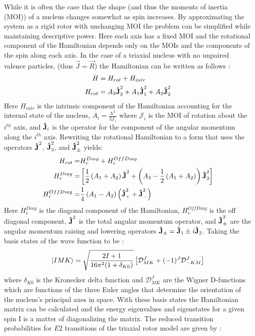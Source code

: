 While it is often the case that the shape (and thus the moments of inertia (MOI)) of a nucleus changes somewhat as spin increases. By approximating the system as a rigid rotor with unchanging MOI the problem can be simplified while maintaining descriptive power. Here each axis has a fixed MOI and the rotational component of the Hamiltonian depends only on the MOIs and the components of the spin along each axis. In the case of a triaxial nucleus with no unpaired valence particles, (thus $\vec{J}=\vec{R}$) the Hamiltonian can be written as follows \cite{triaxRotorSol,wobblingGeometry}:
\begin{align}
\label{eqn:chp2-triaxial-rotor-hamiltonian}
H &= H_{rot} + H_{intr} \\
H_{rot}&=A_3\boldsymbol{\hat{\textbf{J}}}_3^2 + A_1\boldsymbol{\hat{\textbf{J}}}_1^2 + A_2\boldsymbol{\hat{\textbf{J}}}_2^2
\end{align}
Here $H_{intr}$ is the intrinsic component of the Hamiltonian accounting for the internal state of the nucleus, $A_i = \frac{\hbar^2}{2 \mathcal{J}_i}$ where $\mathcal{J}_i$ is the MOI of rotation about the $i^{th}$ axis, and $\boldsymbol{\hat{\textbf{J}}}_i$ is the operator for the component of the angular momentum along the $i^{th}$ axis. Rewriting the rotational Hamiltonian to a form that uses the operators $\boldsymbol{\hat{\textbf{J}}}^2$, $\boldsymbol{\hat{\textbf{J}}}^2_3$, and $\boldsymbol{\hat{\textbf{J}}}^2_{\pm}$ yields:
\begin{align}
\label{eqn:chp2-triaxial-rotor-hamiltonian-rewrite}
H_{rot}=& H_{r}^{Diag} + H_{r}^{OffDiag}\\
H_{r}^{Diag}=&\left[\frac{1}{2}\left(A_1+A_2\right)\boldsymbol{\hat{\textbf{J}}}^2 + \left(A_3-\frac{1}{2}\left(A_1+A_2\right)\right)\boldsymbol{\hat{\textbf{J}}}^2_3\right]\nonumber\\
H_{r}^{OffDiag}=&\frac{1}{4}\left(A_1-A_2\right)\left(\boldsymbol{\hat{\textbf{J}}}^2_++\boldsymbol{\hat{\textbf{J}}}^2_-\right) \nonumber
\end{align}
Here $H_{r}^{Diag}$ is the diagonal component of the Hamiltonian, $H_{r}^{OffDiag}$ is the off diagonal component, $\boldsymbol{\hat{\textbf{J}}}^2$ is the total angular momentum operator, and $\boldsymbol{\hat{\textbf{J}}}^2_{\pm}$ are the angular momentum raising and lowering operators $\boldsymbol{\hat{\textbf{J}}}_{\pm} = \boldsymbol{\hat{\textbf{J}}}_1\pm\mathit{i}\boldsymbol{\hat{\textbf{J}}}_2$. Taking the basis states of the wave function to be \cite{triaxRotorSol}:
\begin{equation}
\label{eqn:chp2-triaxial-rotor-basis}
\Ket{IMK}= \sqrt{\frac{2I+1}{16\pi^{2}(1+\delta_{K0})}} \left[\mathcal{D}^{J}_{MK} + (-1)^J \mathcal{D}^{J}_{-KM}\right]
\end{equation}
where $\delta_{K0}$ is the Kronecker delta function and $\mathcal{D}^{J}_{MK}$ are the Wigner D-functions which are functions of the three Euler angles that determine the orientation of the nucleus's principal axes in space. With these basis states the Hamiltonian matrix can be calculated and the energy eigenvalues and eigenstates for a given spin I is a matter of diagonalizing the matrix. The reduced transition probabilities for $E2$ transitions of the triaxial rotor model are given by \cite{wobblingGeometry}:

